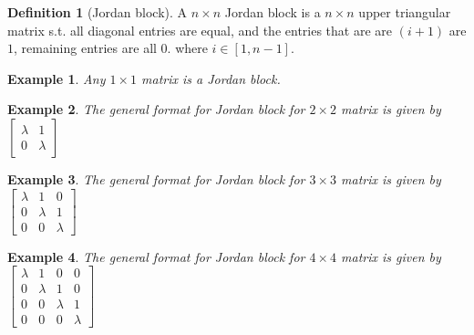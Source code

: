 \documentclass{article}
\theoremstyle{MyNonumberplain}
\theoremstyle{break}
\theoremstyle{break}
\newtheorem{example}{Example}[section]
\theoremstyle{break}
\theoremstyle{definition}
\theoremstyle{break}
\newtheorem{definition}{Definition}[section]
\begin{document}
\begin{defbox}
    \begin{definition}[Jordan block]
        A $n \times n$ Jordan block is a $n \times n$ upper triangular matrix s.t. all
        diagonal entries are equal, and the entries that are are $(i + 1)$ are $1$,
        remaining entries are all $0$. where $i \in [1, n - 1]$.
    \end{definition}
\end{defbox}

\begin{expbox}
    \begin{example}
        Any $1 \times 1$ matrix is a Jordan block. 
    \end{example}
\end{expbox}

\begin{expbox}
    \begin{example}
        The general format for Jordan block for $2 \times 2$ matrix is given by
        $\left[\begin{array}{cc}
          \lambda & 1\\
          0 & \lambda
        \end{array}\right]$
    \end{example}
\end{expbox}

\begin{expbox}
    \begin{example}
        The general format for Jordan block for $3 \times 3$ matrix is given by \
        $\left[\begin{array}{ccc}
          \lambda & 1 & 0\\
          0 & \lambda & 1\\
          0 & 0 & \lambda
        \end{array}\right]$
    \end{example}
\end{expbox}

\begin{expbox}
    \begin{example}
        The general format for Jordan block for $4 \times 4$ matrix is given by \
        $\left[\begin{array}{cccc}
          \lambda & 1 & 0 & 0\\
          0 & \lambda & 1 & 0\\
          0 & 0 & \lambda & 1\\
          0 & 0 & 0 & \lambda
        \end{array}\right]$
    \end{example}
\end{expbox}
\end{document}
